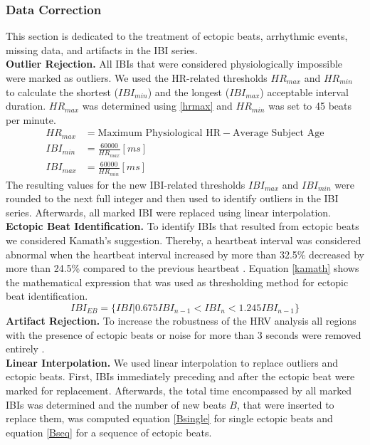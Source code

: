 \subsubsection{Data Correction}
This section is dedicated to the treatment of ectopic beats, arrhythmic events, missing data, and artifacts in the IBI series. \\
\textbf{Outlier Rejection.} All IBIs that were considered physiologically impossible were marked as outliers. We used the HR-related thresholds $HR_{max}$ and $HR_{min}$ to calculate the shortest ($IBI_{min}$) and the longest ($IBI_{max}$) acceptable interval duration. $HR_{max}$ was determined using \ref{hrmax} and $HR_{min}$ was set to 45 beats per minute.
\begin{align}\label{hrmax}
HR_{max} &= \text{Maximum Physiological HR} - \text{Average Subject Age}\\
IBI_{min} &= \frac{60000}{HR_{max}}	[ms]\\
IBI_{max} &= \frac{60000}{HR_{min}}	[ms]
\end{align}
The resulting values for the new IBI-related thresholds $IBI_{max}$ and $IBI_{min}$ were rounded to the next full integer and then used to identify outliers in the IBI series. Afterwards, all marked IBI were replaced using linear interpolation.\\
\textbf{Ectopic Beat Identification.} To identify IBIs that resulted from ectopic beats we considered Kamath's suggestion. Thereby, a heartbeat interval was considered abnormal when the heartbeat interval increased by more than 32.5\% decreased by more than 24.5\% compared to the previous heartbeat \cite{Choi2016}. Equation \ref{kamath} shows the mathematical expression that was used as thresholding method for ectopic beat identification. 
\begin{equation} \label{kamath}
IBI_{EB} = \lbrace IBI\vert 0.675 IBI_{n-1} < IBI_{n} < 1.245 IBI_{n-1}\rbrace  
\end{equation}
\textbf{Artifact Rejection.} To increase the robustness of the HRV analysis all regions with the presence of ectopic beats or noise for more than 3 seconds were removed entirely \cite{Clifford2002}.\\
\textbf{Linear Interpolation.} We used linear interpolation to replace outliers and ectopic beats. First, IBIs immediately preceding and after the ectopic beat were marked for replacement. Afterwards, the total time encompassed by all marked IBIs was determined and the number of new beats $B$, that were inserted to replace them, was computed equation \ref{Bsingle} for single ectopic beats and equation \ref{Bseq} for a sequence of ectopic beats.

